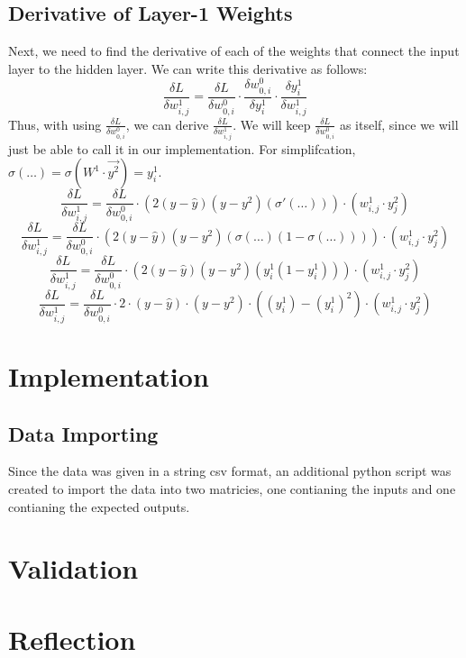 \documentclass[10pt]{article}
\begin{document}
\subsection{Derivative of Layer-1 Weights}
Next, we need to find the derivative of each of the weights that connect the input layer to the hidden layer. We can write this derivative as follows:
$$\frac{\delta L}{\delta w^1_{i,j}} = \frac{\delta L}{\delta w^0_{0,i}} \cdot \frac{\delta w^0_{0,i}}{\delta y^1_i} \cdot \frac{\delta y^1_i}{\delta w^1_{i,j}}$$
Thus, with using $\frac{\delta L}{\delta w^0_{0,i}}$, we can derive $\frac{\delta L}{\delta w^1_{i,j}}$. We will keep $\frac{\delta L}{\delta w^0_{0,i}}$ as itself, since we will just be able to call it in our implementation.
\newline
For simplifcation, $\sigma(\ldots) = \sigma(W^1 \cdot \vec{y^2}) = y^1_i$.
$$\frac{\delta L}{\delta w^1_{i,j}} = \frac{\delta L}{\delta w^0_{0,i}} \cdot (2(y-\hat{y})(y - y^2)(\sigma'(\ldots))) \cdot (w^1_{i,j} \cdot y^2_{j})$$
$$\frac{\delta L}{\delta w^1_{i,j}} = \frac{\delta L}{\delta w^0_{0,i} } \cdot (2(y - \hat{y})(y - y^2)(\sigma(\ldots)(1 - \sigma(\ldots)))) \cdot (w^1_{i,j} \cdot y^2_{j})$$
$$\frac{\delta L}{\delta w^1_{i,j}} = \frac{\delta L}{\delta w^0_{0,i}} \cdot (2(y - \hat{y})(y - y^2)(y^1_i (1 - y^1_i))) \cdot (w^1_{i,j} \cdot y^2_{j})$$
$$\frac{\delta L}{\delta w^1_{i,j}} = \frac{\delta L}{\delta w^0_{0,i}} \cdot 2 \cdot (y - \hat{y}) \cdot (y - y^2) \cdot ((y^1_i) - (y^1_i)^2) \cdot (w^1_{i,j} \cdot y^2_{j})$$





\section{Implementation}
\subsection{Data Importing}
Since the data was given in a string csv format, an additional python script was created to import the data into two matricies, one contianing the inputs and one contianing the expected outputs.
\section{Validation}
\section{Reflection}
\end{document}
